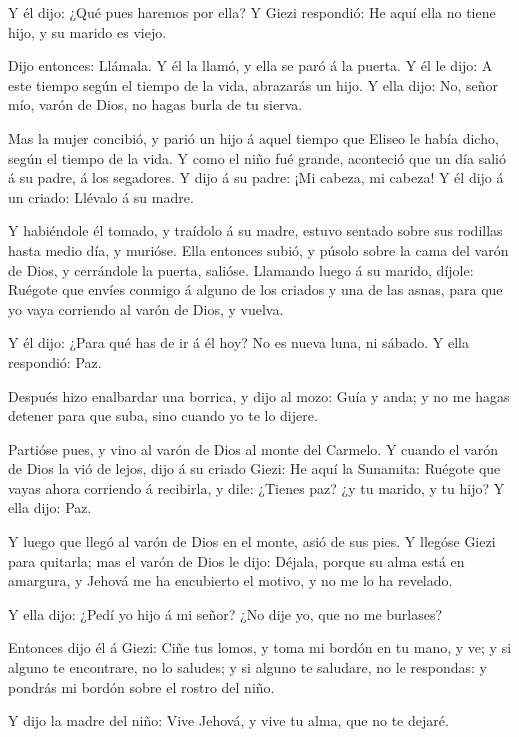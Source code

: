  Y él dijo: ¿Qué pues haremos por ella? Y Giezi respondió:
He aquí ella no tiene hijo, y su marido es viejo.

 Dijo entonces: Llámala. Y él la llamó, y ella se paró á la
puerta.  Y él le dijo: A este tiempo según el tiempo de la
vida, abrazarás un hijo. Y ella dijo: No, señor mío, varón de Dios, no
hagas burla de tu sierva.

 Mas la mujer concibió, y parió un hijo á aquel tiempo que
Eliseo le había dicho, según el tiempo de la vida.  Y como
el niño fué grande, aconteció que un día salió á su padre, á los
segadores.  Y dijo á su padre: ¡Mi cabeza, mi cabeza! Y él
dijo á un criado: Llévalo á su madre.

 Y habiéndole él tomado, y traídolo á su madre, estuvo
sentado sobre sus rodillas hasta medio día, y murióse. 
Ella entonces subió, y púsolo sobre la cama del varón de Dios, y
cerrándole la puerta, salióse.  Llamando luego á su marido,
díjole: Ruégote que envíes conmigo á alguno de los criados y una de las
asnas, para que yo vaya corriendo al varón de Dios, y vuelva.

 Y él dijo: ¿Para qué has de ir á él hoy? No es nueva luna,
ni sábado. Y ella respondió: Paz.

 Después hizo enalbardar una borrica, y dijo al mozo: Guía
y anda; y no me hagas detener para que suba, sino cuando yo te lo
dijere.

 Partióse pues, y vino al varón de Dios al monte del
Carmelo. Y cuando el varón de Dios la vió de lejos, dijo á su criado
Giezi: He aquí la Sunamita:  Ruégote que vayas ahora
corriendo á recibirla, y dile: ¿Tienes paz? ¿y tu marido, y tu hijo? Y
ella dijo: Paz.

 Y luego que llegó al varón de Dios en el monte, asió de
sus pies. Y llegóse Giezi para quitarla; mas el varón de Dios le dijo:
Déjala, porque su alma está en amargura, y Jehová me ha encubierto el
motivo, y no me lo ha revelado.

 Y ella dijo: ¿Pedí yo hijo á mi señor? ¿No dije yo, que no
me burlases?

 Entonces dijo él á Giezi: Ciñe tus lomos, y toma mi bordón
en tu mano, y ve; y si alguno te encontrare, no lo saludes; y si alguno
te saludare, no le respondas: y pondrás mi bordón sobre el rostro del
niño.

 Y dijo la madre del niño: Vive Jehová, y vive tu alma, que
no te dejaré.

